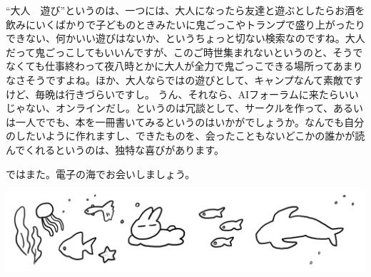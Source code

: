 \documentclass[dvipdfmx,autodetect-engine,10pt,b5paper,papersize,openany,dvipsnames]{jsbook}
\begin{document}
\begin{multicols}{2}
“大人　遊び”というのは、一つには、大人になったら友達と遊ぶとしたらお酒を飲みにいくばかりで子どものときみたいに鬼ごっこやトランプで盛り上がったりできない、何かいい遊びはないか、というちょっと切ない検索なのですね。大人だって鬼ごっこしてもいいんですが、このご時世集まれないというのと、そうでなくても仕事終わって夜八時とかに大人が全力で鬼ごっこできる場所ってあまりなさそうですよね。ほか、大人ならではの遊びとして、キャンプなんて素敵ですけど、毎晩は行きづらいですし。
うん、それなら、AIフォーラムに来たらいいじゃない、オンラインだし。というのは冗談として、サークルを作って、あるいは一人ででも、本を一冊書いてみるというのはいかがでしょうか。なんでも自分のしたいように作れますし、できたものを、会ったこともないどこかの誰かが読んでくれるというのは、独特な喜びがあります。

ではまた。電子の海でお会いしましょう。
\end{multicols}


\includegraphics[width=\textwidth]{images/202101/newsletter20210218_3.png}


\newpage
\end{document}
